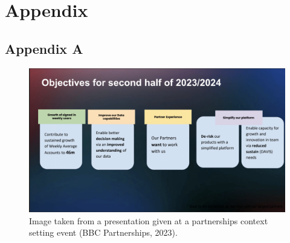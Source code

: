 \section{Appendix}

  \subsection{Appendix A}
  \label{sec:AppendixA}
  \begin{figure}[H]
    \centering
    \includegraphics[width=12cm]{assets/appendix/partnershipsObjectives.png}
    \caption{Image taken from a presentation given at a partnerships context setting event (BBC Partnerships, 2023).}
    \label{fig:partnershipsObjectives}
  \end{figure}
